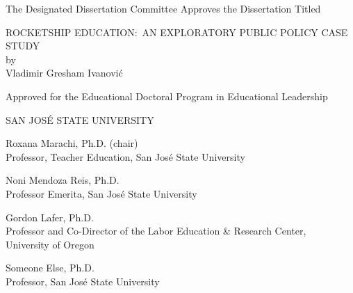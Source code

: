 
\begin{vplace}%
\OnehalfSpacing%
\begin{center}
The Designated Dissertation Committee Approves the Dissertation Titled\\
\vspace{2\baselineskip}

ROCKETSHIP EDUCATION:~AN EXPLORATORY PUBLIC POLICY CASE STUDY\\
by\\
Vladimir Gresham Ivanović\\
\vspace{2\baselineskip}

Approved for the Educational Doctoral Program in Educational Leadership\\
\vspace{2\baselineskip}

SAN JOSÉ STATE UNIVERSITY\\
\end{center}
\vspace{\baselineskip}

Roxana Marachi, Ph.D. (chair)\hrulefill\\%
Professor, Teacher Education, San José State University\\
\vspace{\baselineskip}

Noni Mendoza Reis, Ph.D.\hrulefill\\%
Professor Emerita, San José State University\\
\vspace{\baselineskip}

Gordon Lafer, Ph.D.\hrulefill\\%
Professor and Co-Director of the Labor Education \& Research Center,\\
University of Oregon
\vspace{\baselineskip}

Someone Else, Ph.D.\hrulefill\\%
Professor, San José State University

\end{vplace}

\thispagestyle{empty}

